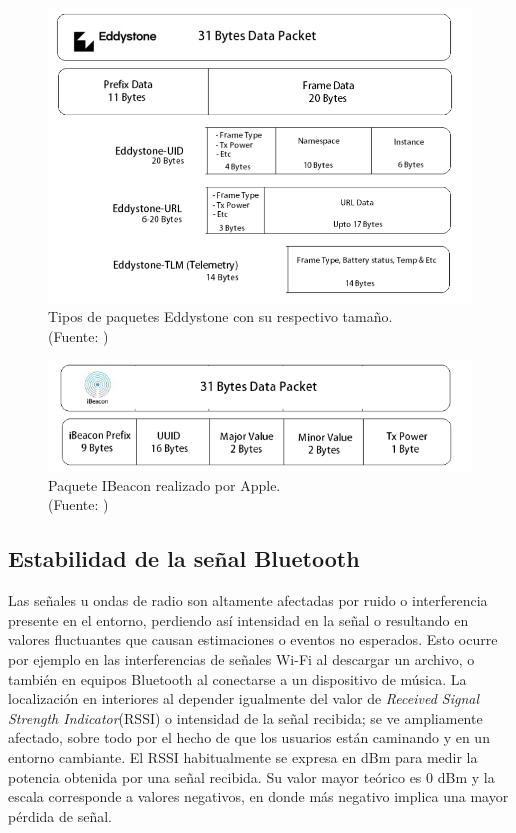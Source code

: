\begin{figure}[ht!]
\centering
\includegraphics[width=.6\textwidth]{figures/eddystoneProtocol.png}
\caption[Tipos de paquetes Eddystone con su respectivo tamaño]{Tipos de paquetes Eddystone con su respectivo tamaño.\\
{\scriptsize (Fuente: \citep{protocolosBeacon})}}
\label{fig:eddystone}
\end{figure}

\begin{figure}[ht!]
\centering
\includegraphics[width=.6\textwidth]{figures/ibeaconProtocol.png}
\caption[Paquete IBeacon realizado por Apple]{Paquete IBeacon realizado por Apple.\\
{\scriptsize (Fuente: \citep{protocolosBeacon})}}
\label{fig:ibeacon}
\end{figure}

\subsection{Estabilidad de la señal Bluetooth}

Las señales u ondas de radio son altamente afectadas por ruido o interferencia presente en el entorno, perdiendo así intensidad en la señal o resultando en valores fluctuantes que causan estimaciones o eventos no esperados. Esto ocurre por ejemplo en las interferencias de señales Wi-Fi al descargar un archivo, o también en equipos Bluetooth al conectarse a un dispositivo de música. La localización en interiores al depender igualmente del valor de \textit{Received Signal Strength Indicator}(RSSI) o intensidad de la señal recibida; se ve ampliamente afectado, sobre todo por el hecho de que los usuarios están caminando y en un entorno cambiante. El RSSI habitualmente se expresa en dBm para medir la potencia obtenida por una señal recibida. Su valor mayor teórico es 0 dBm y la escala corresponde a valores negativos, en donde más negativo implica una mayor pérdida de señal.

